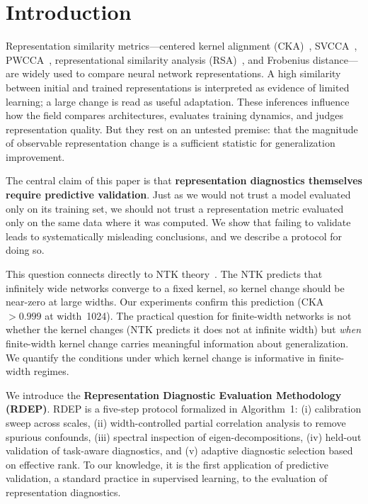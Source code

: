 \documentclass[twoside,11pt]{article}
\begin{document}
\section{Introduction}
\label{sec:intro}

Representation similarity metrics---centered kernel alignment (CKA)~\citep{kornblith2019similarity}, SVCCA~\citep{raghu2017svcca}, PWCCA~\citep{morcos2018insights}, representational similarity analysis (RSA)~\citep{klabunde2023similarity}, and Frobenius distance---are widely used to compare neural network representations. A high similarity between initial and trained representations is interpreted as evidence of limited learning; a large change is read as useful adaptation. These inferences influence how the field compares architectures, evaluates training dynamics, and judges representation quality. But they rest on an untested premise: that the magnitude of observable representation change is a sufficient statistic for generalization improvement.

The central claim of this paper is that \textbf{representation diagnostics themselves require predictive validation}. Just as we would not trust a model evaluated only on its training set, we should not trust a representation metric evaluated only on the same data where it was computed. We show that failing to validate leads to systematically misleading conclusions, and we describe a protocol for doing so.

This question connects directly to NTK theory~\citep{jacot2018neural}. The NTK predicts that infinitely wide networks converge to a fixed kernel, so kernel change should be near-zero at large widths. Our experiments confirm this prediction (CKA $>0.999$ at width~1024). The practical question for finite-width networks is not whether the kernel changes (NTK predicts it does not at infinite width) but \emph{when} finite-width kernel change carries meaningful information about generalization. We quantify the conditions under which kernel change is informative in finite-width regimes.

We introduce the \textbf{Representation Diagnostic Evaluation Methodology (RDEP)}. RDEP is a five-step protocol formalized in Algorithm~1: (i) calibration sweep across scales, (ii) width-controlled partial correlation analysis to remove spurious confounds, (iii) spectral inspection of eigen-decompositions, (iv) held-out validation of task-aware diagnostics, and (v) adaptive diagnostic selection based on effective rank. To our knowledge, it is the first application of predictive validation, a standard practice in supervised learning, to the evaluation of representation diagnostics.
\end{document}

